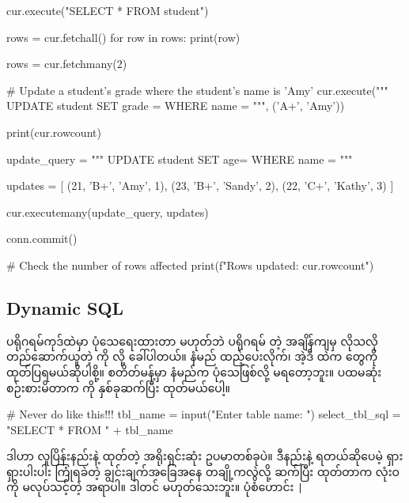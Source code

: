 %
\begin{py}
cur.execute("SELECT * FROM student")

rows = cur.fetchall()
for row in rows:
    print(row)
\end{py}
%

%
\begin{py}
rows = cur.fetchmany(2)
\end{py}
%

%
\begin{py}
# Update a student's grade where the student's name is 'Amy'
cur.execute("""
    UPDATE student
    SET grade = %
    WHERE name = %
""", ('A+', 'Amy'))

print(cur.rowcount)
\end{py}
%

%
\begin{py}
update_query = """
    UPDATE student
    SET age=%
    WHERE name = %
"""

updates = [
    (21, 'B+', 'Amy', 1),
    (23, 'B+', 'Sandy', 2),
    (22, 'C+', 'Kathy', 3)
]

cur.executemany(update_query, updates)

conn.commit()

# Check the number of rows affected
print(f"Rows updated: {cur.rowcount}")
\end{py}
%

\subsection*{Dynamic SQL}
ပရိုဂရမ်ကုဒ်ထဲမှာ ပုံသေရေးထားတာ မဟုတ်ဘဲ ပရိုဂရမ်  တဲ့ အချိန်ကျမှ လိုသလို တည်ဆောက်ယူတဲ့  ကို  လို့ ခေါ်ပါတယ်။  နံမည် ထည့်ပေးလိုက်၊ အဲ့ဒီ  ထဲက  တွေကို ထုတ်ပြရမယ်ဆိုပါစို့။  စတိတ်မန့်မှာ  နံမည်က ပုံသေဖြစ်လို့ မရတော့ဘူး။ ပထမဆုံး စဉ်းစားမိတာက  ကို  နှစ်ခုဆက်ပြီး ထုတ်မယ်ပေါ့။
%
\begin{py}
# Never do like this!!!
tbl_name = input("Enter table name: ")
select_tbl_sql = "SELECT * FROM " + tbl_name 
\end{py}
%
ဒါဟာ လူပြိန်းနည်းနဲ့  ထုတ်တဲ့ အရိုးရှင်းဆုံး ဥပမာတစ်ခုပဲ။ ဒီနည်းနဲ့ ရတယ်ဆိုပေမဲ့ ရှားရှားပါးပါး ကြုံရခဲတဲ့ ချွင်းချက်အခြေအနေ တချို့ကလွဲလို့  ဆက်ပြီး  ထုတ်တာက လုံးဝကို မလုပ်သင့်တဲ့ အရာပါ။ ဒါတင် မဟုတ်သေးဘူး။ \fEn{,} \fEn{,} \fEn{,} ပုံစံဟောင်း \texttt|%


